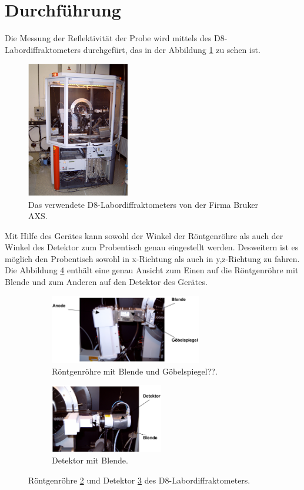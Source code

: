 \section{Durchführung}
\label{sec:Durchführung}
Die Messung der Reflektivität der Probe wird mittels
des D8-Labordiffraktometers
durchgefürt, das in der Abbildung \ref{fig:app} zu sehen ist.
\begin{figure}
  \centering
  \includegraphics[width=0.4\textwidth]{bilder/apparatur.PNG}
  \caption{Das verwendete D8-Labordiffraktometers von der Firma Bruker AXS. \cite{sample}}
  \label{fig:app}
\end{figure}

Mit Hilfe des Gerätes kann sowohl der
Winkel der Röntgenröhre
als auch der Winkel des Detektor zum Probentisch
genau eingestellt werden. Desweitern ist es
möglich den Probentisch sowohl in x-Richtung als auch in
y,z-Richtung zu fahren.
Die Abbildung \ref{fig:anode_det} enthält eine genau
Ansicht zum Einen auf die
Röntgenröhre mit Blende und zum Anderen auf den Detektor des Gerätes.

\begin{figure}
  \centering
  \begin{subfigure}{0.59\textwidth}
  \includegraphics[height=3cm]{bilder/anode.PNG}
  \caption{Röntgenröhre mit Blende und Göbelspiegel??.}
  \label{fig:anode}
\end{subfigure}
\begin{subfigure}{0.39\textwidth}
\includegraphics[height=3cm]{bilder/detektor.PNG}
\caption{Detektor mit Blende.}
\label{fig:det}
\end{subfigure}
\caption{Röntgenröhre \ref{fig:anode} und Detektor \ref{fig:det} des D8-Labordiffraktometers. \cite{sample}}
\label{fig:anode_det}
\end{figure}

